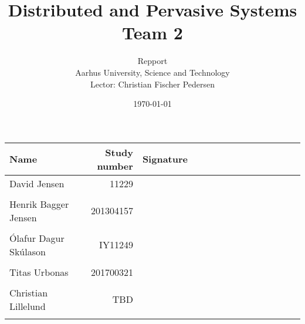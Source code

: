 \documentclass[a4paper,11pt,twoside,openright]{memoir}
\title{Distributed and Pervasive Systems \\ Team 2}
\author{Repport \\ Aarhus University, Science and Technology \\ Lector: Christian Fischer Pedersen}
\date{\today}
\begin{document}
\fancyhf{} %
\frontmatter
\maketitle
\vfill


\begin{table} [h]
	\centering
	\begin{tabular}{|l|r|l|}
	\hline 
	\textbf{Name} 				& \textbf{Study number} & \textbf{Signature~~~~~~~~~~~~~~~~~~~~} 	\\ \hline
	David Jensen 				& 11229 	& \\ && 												\\ \hline
	Henrik Bagger Jensen 		& 201304157 & \\ && 												\\ \hline
	Ólafur Dagur Skúlason 		& IY11249	& \\ && 												\\ \hline
	Titas Urbonas 				& 201700321 & \\ && 												\\ \hline
	Christian Lillelund 		& TBD & \\ && 												\\ \hline

	\end{tabular}
\end{table}

\clearpage
\pagestyle{plain}

\tableofcontents

\vfill

\mainmatter
\pagestyle{fancy}
\fancyhf{} %
\fancyhead[CE,CO]{\nouppercase{\leftmark}}
\fancyfoot[CO,CE]{\nouppercase{\rightmark}}
\fancyfoot[LE,RO]{\thepage}

				\cleartorightpage
	\cleartorightpage
		\cleartorightpage
		\cleartorightpage
					\cleartorightpage
				\cleartorightpage
			\cleartorightpage
			\cleartorightpage
				\cleartorightpage
				    \cleartorightpage
				    \cleartorightpage
				\cleartorightpage
					\cleartorightpage

\end{document}
